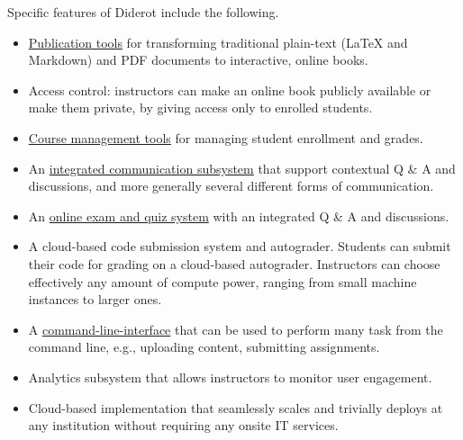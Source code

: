 \begin{gram}[Features]
%
Specific features of Diderot include the following.

\begin{itemize}

\item  
\href{ch:dc}{Publication tools} 
%
for transforming traditional plain-text (LaTeX and Markdown) and PDF documents to interactive, online books. 

\item 
Access control: instructors can make an online book publicly
available or make them private, by giving access only to enrolled
students.

 
\item \href{ch:lms}{Course management tools} for managing student enrollment and grades.

\item An \href{ch:posts}{integrated communication subsystem} that support contextual Q
  \& A and discussions, and more generally several different forms of
  communication.
  
\item An \href{ch:quiz}{online exam and quiz system} with an integrated Q \& A and discussions.  

\item A cloud-based code submission system and autograder. Students
  can submit their code for grading on a cloud-based
  autograder. Instructors can choose effectively any amount of compute
  power, ranging from small machine instances to larger ones.

\item A \href{ch:cli}{command-line-interface} that can be used to
  perform many task from the command line, e.g., uploading content,
  submitting assignments.

\item
  Analytics subsystem that allows instructors to monitor user
  engagement.
  
\item  
  Cloud-based implementation that seamlessly scales and trivially
  deploys at any institution without requiring any onsite IT services.
\end{itemize}
\end{gram}
